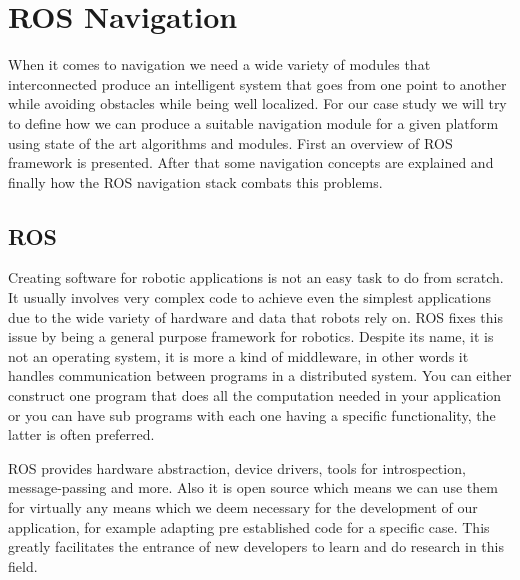 \chapter{ROS Navigation} \label{ch:BaseWork}


When it comes to navigation we need a wide variety of modules that interconnected produce an intelligent system that goes from one point to another while avoiding obstacles while being well localized. For our case study we will try to define how we can produce a suitable navigation module for a given platform using state of the art algorithms and modules. First an overview of \ac{ROS} framework is presented. After that some navigation concepts are explained and finally how the \ac{ROS} navigation stack combats this problems.

\section {ROS}
Creating software for robotic applications is not an easy task to do from scratch. It usually involves very complex code to achieve even the simplest applications due to the wide variety of hardware and data that robots rely on. \ac{ROS} \cite{ros} fixes this issue by being a general purpose framework for robotics. Despite its name, it is not an operating system, it is more a kind of middleware, in other words it  handles communication between programs in a distributed system. You can either construct one program that does all the computation needed in your application or you can have sub programs with each one having a specific functionality, the latter is often preferred.

\ac{ROS} provides hardware abstraction, device drivers, tools for introspection, message-passing and more. Also it is open source which means we can use them for virtually any means which we deem necessary for the development of our application, for example adapting pre established code for a specific case. This greatly facilitates the entrance of new developers to learn and do research in this field.
